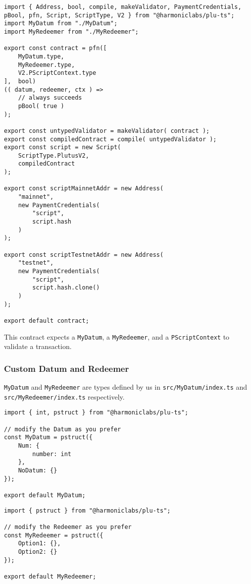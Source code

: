 \begin{lstlisting}
import { Address, bool, compile, makeValidator, PaymentCredentials, pBool, pfn, Script, ScriptType, V2 } from "@harmoniclabs/plu-ts";
import MyDatum from "./MyDatum";
import MyRedeemer from "./MyRedeemer";

export const contract = pfn([
    MyDatum.type,
    MyRedeemer.type,
    V2.PScriptContext.type
],  bool)
(( datum, redeemer, ctx ) =>
    // always succeeds
    pBool( true )
);

export const untypedValidator = makeValidator( contract );
export const compiledContract = compile( untypedValidator );
export const script = new Script(
    ScriptType.PlutusV2,
    compiledContract
);

export const scriptMainnetAddr = new Address(
    "mainnet",
    new PaymentCredentials(
        "script",
        script.hash
    )
);

export const scriptTestnetAddr = new Address(
    "testnet",
    new PaymentCredentials(
        "script",
        script.hash.clone()
    )
);

export default contract;
\end{lstlisting}

This contract expects a \texttt{MyDatum}, a \texttt{MyRedeemer}, and a \texttt{PScriptContext} to validate a transaction.

\subsubsection{Custom Datum and Redeemer}
\texttt{MyDatum} and \texttt{MyRedeemer} are types defined by us in \texttt{src/MyDatum/index.ts} and \texttt{src/MyRedeemer/index.ts} respectively.

\begin{lstlisting}
import { int, pstruct } from "@harmoniclabs/plu-ts";

// modify the Datum as you prefer
const MyDatum = pstruct({
    Num: {
        number: int
    },
    NoDatum: {}
});

export default MyDatum;
\end{lstlisting}

\begin{lstlisting}
import { pstruct } from "@harmoniclabs/plu-ts";

// modify the Redeemer as you prefer
const MyRedeemer = pstruct({
    Option1: {},
    Option2: {}
});

export default MyRedeemer;
\end{lstlisting}

